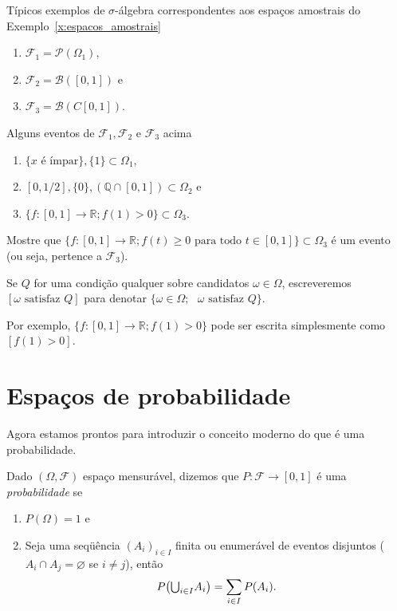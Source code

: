 \documentclass[../main/Notas_de_aula.tex]{subfiles}
\begin{document}
\begin{example} Típicos exemplos de $\sigma$-álgebra correspondentes aos espaços amostrais do Exemplo~\ref{x:espacos_amostrais}
  \begin{enumerate}[\quad a)]
  \item $\mathcal{F}_1 = \mathcal{P}(\Omega_1)$,
  \item $\mathcal{F}_2 = \mathcal{B}([0,1])$ e
  \item $\mathcal{F}_3 = \mathcal{B}(C[0,1])$.
  \end{enumerate}
\end{example}

\begin{example} Alguns eventos de $\mathcal{F}_1, \mathcal{F}_2$ e $\mathcal{F}_3$ acima
  \begin{enumerate}[\quad a)]
  \item $\{\text{$x$ é ímpar}\}, \{1\} \subset \Omega_1$,
  \item $[0,1/2], \{0\}, (\mathbb{Q} \cap [0,1]) \subset \Omega_2$ e
  \item $\{f:[0,1] \to \mathbb{R}; f(1) > 0\} \subset \Omega_3$.
  \end{enumerate}
\end{example}

\begin{exercise}
  Mostre que $\{f:[0,1] \to \mathbb{R}; f(t) \geq 0 \text{ para todo $t \in [0,1]$}\} \subset \Omega_3$ é um evento (ou seja, pertence a $\mathcal{F}_3$).
\end{exercise}

\begin{notation}
  Se $Q$ for uma condição qualquer sobre candidatos $\omega \in \Omega$, escreveremos $[\text{$\omega$ satisfaz $Q$}]$  para denotar $\{\omega \in \Omega; \text{ $\omega$ satisfaz $Q$}\}$.
\end{notation}

Por exemplo, $\{f:[0,1] \to \mathbb{R}; f(1) > 0\}$ pode ser escrita simplesmente como $[f(1) > 0]$.

\section{Espaços de probabilidade}

Agora estamos prontos para introduzir o conceito moderno do que é uma probabilidade.

\begin{definition}
  Dado $(\Omega, \mathcal{F})$ espaço mensurável, dizemos que $P:\mathcal{F} \to [0,1]$ é uma \emph{probabilidade}  se
  \begin{enumerate}[\quad a)]
  \item $P(\Omega) = 1$ e
  \item Seja uma seqüência $(A_i)_{i\in I}$ finita ou enumerável de eventos disjuntos ($A_i \cap A_j = \varnothing$ se $i \neq j$), então
    \begin{equation}
      P\big({\operatorname*{{\textstyle \bigcup}}\nolimits_{i\in I}} A_i\big) = \sum_{i\in I} P(A_i).
    \end{equation}
  \end{enumerate}
\end{definition}
\end{document}

